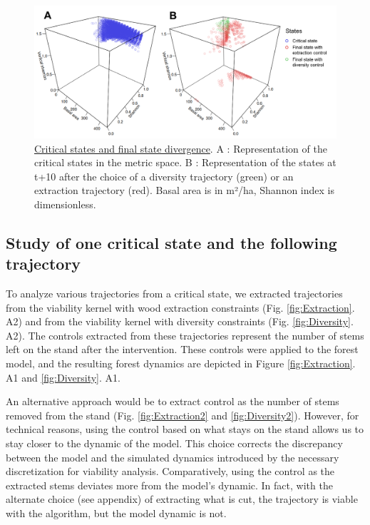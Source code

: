 \documentclass{article}
\begin{document}
\begin{figure}[hb!] 
    \centering
    \includegraphics[width=\textwidth]{Figure/Results/Criticals_states.png}
    \caption{\underline{Critical states and final state divergence}. A : Representation of the critical states in the metric space. B : Representation of the states at t+10 after the choice of a diversity trajectory (green) or an extraction trajectory (red). Basal area is in m²/ha, Shannon index is dimensionless.}
    \label{fig:Criticals_states}
\end{figure}

\subsection{Study of one critical state and the following trajectory}

To analyze various trajectories from a critical state, we extracted trajectories from the viability kernel with wood extraction constraints (Fig. \ref{fig:Extraction}. A2) and from the viability kernel with diversity constraints (Fig. \ref{fig:Diversity}. A2). The controls extracted from these trajectories represent the number of stems left on the stand after the intervention. These controls were applied to the forest model, and the resulting forest dynamics are depicted in Figure \ref{fig:Extraction}. A1 and \ref{fig:Diversity}. A1.

An alternative approach would be to extract control as the number of stems removed from the stand (Fig. \ref{fig:Extraction2} and \ref{fig:Diversity2}). However, for technical reasons, using the control based on what stays on the stand allows us to stay closer to the dynamic of the model. This choice corrects the discrepancy between the model and the simulated dynamics introduced by the necessary discretization for viability analysis. Comparatively, using the control as the extracted stems deviates more from the model's dynamic. In fact, with the alternate choice (see appendix) of extracting what is cut, the trajectory is viable with the algorithm, but the model dynamic is not.
\end{document}
